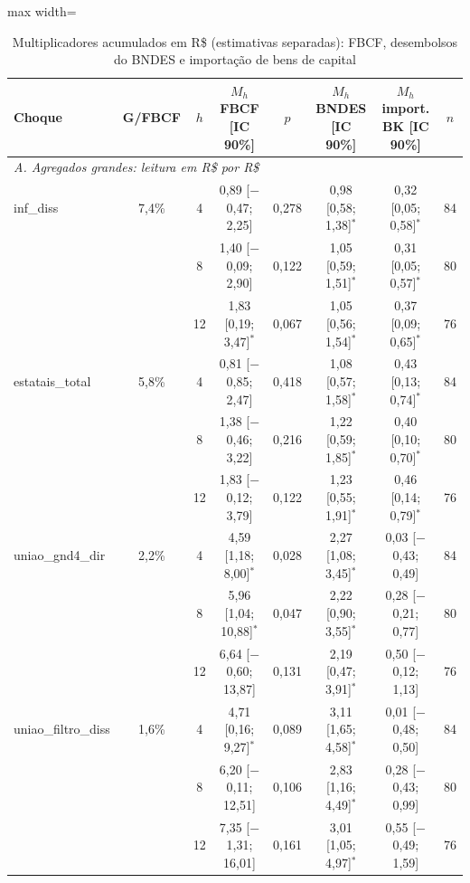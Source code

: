 \begin{table}[htbp]
\centering
\caption{Multiplicadores acumulados em R\$ (estimativas separadas): FBCF, desembolsos do BNDES e importa\c{c}\~ao de bens de capital}
\label{tab:a6_lp_mult}
\scriptsize
\begin{adjustbox}{max width=\linewidth}
\begin{tabular}{lccccccc}
\toprule
Choque & G/FBCF & $h$ & $M_h$ FBCF [IC 90\%] & $p$ & $M_h$ BNDES [IC 90\%] & $M_h$ import. BK [IC 90\%] & $n$ \\
\midrule
\multicolumn{8}{l}{\textit{A. Agregados grandes: leitura em R\$ por R\$}} \\
inf\_diss & 7{,}4\% & 4 & 0{,}89 [$-$0{,}47; 2{,}25] & 0{,}278 & 0{,}98 [0{,}58; 1{,}38]$^{*}$ & 0{,}32 [0{,}05; 0{,}58]$^{*}$ & 84 \\
 &  & 8 & 1{,}40 [$-$0{,}09; 2{,}90] & 0{,}122 & 1{,}05 [0{,}59; 1{,}51]$^{*}$ & 0{,}31 [0{,}05; 0{,}57]$^{*}$ & 80 \\
 &  & 12 & 1{,}83 [0{,}19; 3{,}47]$^{*}$ & 0{,}067 & 1{,}05 [0{,}56; 1{,}54]$^{*}$ & 0{,}37 [0{,}09; 0{,}65]$^{*}$ & 76 \\
estatais\_total & 5{,}8\% & 4 & 0{,}81 [$-$0{,}85; 2{,}47] & 0{,}418 & 1{,}08 [0{,}57; 1{,}58]$^{*}$ & 0{,}43 [0{,}13; 0{,}74]$^{*}$ & 84 \\
 &  & 8 & 1{,}38 [$-$0{,}46; 3{,}22] & 0{,}216 & 1{,}22 [0{,}59; 1{,}85]$^{*}$ & 0{,}40 [0{,}10; 0{,}70]$^{*}$ & 80 \\
 &  & 12 & 1{,}83 [$-$0{,}12; 3{,}79] & 0{,}122 & 1{,}23 [0{,}55; 1{,}91]$^{*}$ & 0{,}46 [0{,}14; 0{,}79]$^{*}$ & 76 \\
uniao\_gnd4\_dir & 2{,}2\% & 4 & 4{,}59 [1{,}18; 8{,}00]$^{*}$ & 0{,}028 & 2{,}27 [1{,}08; 3{,}45]$^{*}$ & 0{,}03 [$-$0{,}43; 0{,}49] & 84 \\
 &  & 8 & 5{,}96 [1{,}04; 10{,}88]$^{*}$ & 0{,}047 & 2{,}22 [0{,}90; 3{,}55]$^{*}$ & 0{,}28 [$-$0{,}21; 0{,}77] & 80 \\
 &  & 12 & 6{,}64 [$-$0{,}60; 13{,}87] & 0{,}131 & 2{,}19 [0{,}47; 3{,}91]$^{*}$ & 0{,}50 [$-$0{,}12; 1{,}13] & 76 \\
uniao\_filtro\_diss & 1{,}6\% & 4 & 4{,}71 [0{,}16; 9{,}27]$^{*}$ & 0{,}089 & 3{,}11 [1{,}65; 4{,}58]$^{*}$ & 0{,}01 [$-$0{,}48; 0{,}50] & 84 \\
 &  & 8 & 6{,}20 [$-$0{,}11; 12{,}51] & 0{,}106 & 2{,}83 [1{,}16; 4{,}49]$^{*}$ & 0{,}28 [$-$0{,}43; 0{,}99] & 80 \\
 &  & 12 & 7{,}35 [$-$1{,}31; 16{,}01] & 0{,}161 & 3{,}01 [1{,}05; 4{,}97]$^{*}$ & 0{,}55 [$-$0{,}49; 1{,}59] & 76 \\

\end{tabular}
\end{adjustbox}
\end{table}
